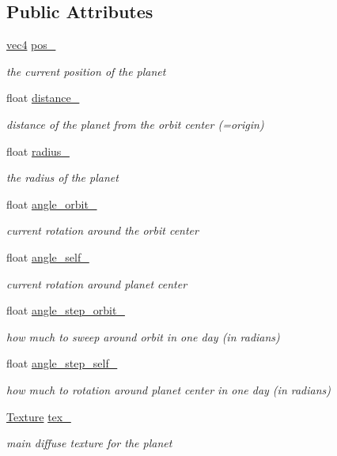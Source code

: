 \subsection*{Public Attributes}
\begin{DoxyCompactItemize}
\item 
\hyperlink{classvec4}{vec4} \hyperlink{classPlanet_aaa60c7184864fe744dcf1fd52a5bae82}{pos\+\_\+}
\begin{DoxyCompactList}\small\item\em the current position of the planet \end{DoxyCompactList}\item 
float \hyperlink{classPlanet_a5179a41d97c015b373b6e8a3f4458f64}{distance\+\_\+}
\begin{DoxyCompactList}\small\item\em distance of the planet from the orbit center (=origin) \end{DoxyCompactList}\item 
float \hyperlink{classPlanet_a9d7230f0afaedba54afa25462639de08}{radius\+\_\+}
\begin{DoxyCompactList}\small\item\em the radius of the planet \end{DoxyCompactList}\item 
float \hyperlink{classPlanet_a674db34348bebd17133630806b8a4523}{angle\+\_\+orbit\+\_\+}
\begin{DoxyCompactList}\small\item\em current rotation around the orbit center \end{DoxyCompactList}\item 
float \hyperlink{classPlanet_abb864fb6e4e677f72d1c3b5622a524af}{angle\+\_\+self\+\_\+}
\begin{DoxyCompactList}\small\item\em current rotation around planet center \end{DoxyCompactList}\item 
float \hyperlink{classPlanet_a91e8faddde8308f4037f4d4cd84e4da3}{angle\+\_\+step\+\_\+orbit\+\_\+}
\begin{DoxyCompactList}\small\item\em how much to sweep around orbit in one day (in radians) \end{DoxyCompactList}\item 
float \hyperlink{classPlanet_ab394e2d2c073a18f3dcd692b8ea62f68}{angle\+\_\+step\+\_\+self\+\_\+}
\begin{DoxyCompactList}\small\item\em how much to rotation around planet center in one day (in radians) \end{DoxyCompactList}\item 
\hyperlink{classTexture}{Texture} \hyperlink{classPlanet_a96a79b3b253480e586f7be9d66e3ef90}{tex\+\_\+}
\begin{DoxyCompactList}\small\item\em main diffuse texture for the planet \end{DoxyCompactList}\end{DoxyCompactItemize}


